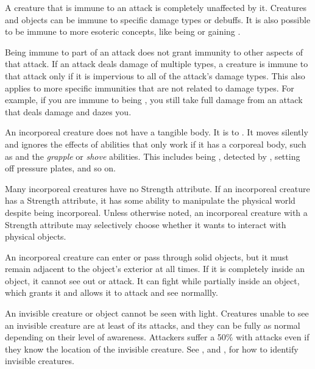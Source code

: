         A creature that is immune to an attack is completely unaffected by it.
        Creatures and objects can be immune to specific damage types or debuffs.
        It is also possible to be immune to more esoteric concepts, like being \grappled or gaining .

        Being immune to part of an attack does not grant immunity to other aspects of that attack.
        If an attack deals damage of multiple types, a creature is immune to that attack only if it is impervious to all of the attack's damage types.
        This also applies to more specific immunities that are not related to damage types.
        For example, if you are immune to being \dazed, you still take full damage from an attack that deals damage and dazes you.

        An incorporeal creature does not have a tangible body.
        It is  to .
        It moves silently and ignores the effects of abilities that only work if it has a corporeal body, such as  and the \textit{grapple} or \textit{shove} abilities.
        This includes being \grappled, detected by , setting off pressure plates, and so on.

        Many incorporeal creatures have no Strength attribute.
        If an incorporeal creature has a Strength attribute, it has some ability to manipulate the physical world despite being incorporeal.
        Unless otherwise noted, an incorporeal creature with a Strength attribute may selectively choose whether it wants to interact with physical objects.

        An incorporeal creature can enter or pass through solid objects, but it must remain adjacent to the object's exterior at all times.
        If it is completely inside an object, it cannot see out or attack.
        It can fight while partially inside an object, which grants it  and allows it to attack and see normallly.

        An invisible creature or object cannot be seen with light.
        Creatures unable to see an invisible creature are at least \partiallyunaware of its attacks, and they can be fully \unaware as normal depending on their level of awareness.
        Attackers suffer a 50\%  with  attacks even if they know the location of the invisible creature.
        See , and , for how to identify invisible creatures.

